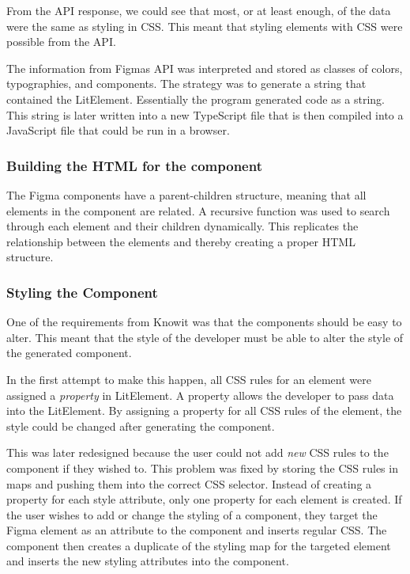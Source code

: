 From the API response, we could see that most, or at least enough, of the data were the same as styling in CSS. This meant that styling elements with CSS were possible from the API.

The information from Figmas API was interpreted and stored as classes of colors, typographies, and components. The strategy was to generate a string that contained the LitElement. Essentially the program generated code as a string. This string is later written into a new TypeScript file that is then compiled into a JavaScript file that could be run in a browser.

\subsubsection{Building the HTML for the component}%
\label{ssub:building the skeleton of the component}
The Figma components have a parent-children structure, meaning that all elements in the component are related. A recursive function was used to search through each element and their children dynamically. This replicates the relationship between the elements and thereby creating a proper HTML structure.


\subsubsection{Styling the Component}%
\label{ssub:Styling the component}
One of the requirements from Knowit was that the components should be easy to alter. This meant that the style of the developer must be able to alter the style of the generated component. 

In the first attempt to make this happen, all CSS rules for an element were assigned a \textit{property} in LitElement. A property allows the developer to pass data into the LitElement. By assigning a property for all CSS rules of the element, the style could be changed after generating the component.

This was later redesigned because the user could not add \textit{new} CSS rules to the component if they wished to. This problem was fixed by storing the CSS rules in maps\cite{ArrayPrototypeMap} and pushing them into the correct CSS selector. Instead of creating a property for each style attribute, only one property for each element is created. If the user wishes to add or change the styling of a component, they target the Figma element as an attribute to the component and inserts regular CSS. The component then creates a duplicate of the styling map for the targeted element and inserts the new styling attributes into the component.


